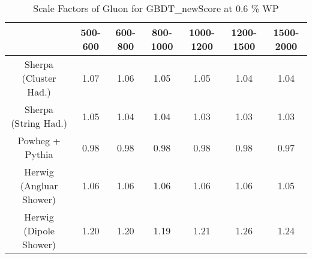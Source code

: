 \begin{table}
\centering
\caption{Scale Factors of Gluon for GBDT_newScore at 0.6 \% WP}
\label{tab:SF_MC_GBDT_newScore_0.6_Gluon}
\begin{tabular}{ccccccc}
\toprule
{} &  500-600 &  600-800 &  800-1000 &  1000-1200 &  1200-1500 &  1500-2000 \\
\midrule
Sherpa (Cluster Had.)   &     1.07 &     1.06 &      1.05 &       1.05 &       1.04 &       1.04 \\
Sherpa (String Had.)    &     1.05 &     1.04 &      1.04 &       1.03 &       1.03 &       1.03 \\
Powheg + Pythia         &     0.98 &     0.98 &      0.98 &       0.98 &       0.98 &       0.97 \\
Herwig (Angluar Shower) &     1.06 &     1.06 &      1.06 &       1.06 &       1.06 &       1.05 \\
Herwig (Dipole Shower)  &     1.20 &     1.20 &      1.19 &       1.21 &       1.26 &       1.24 \\
\bottomrule
\end{tabular}
\end{table}
